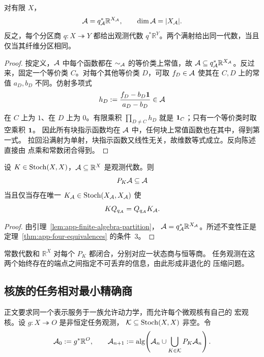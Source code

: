 \begin{lemma}
\label{lem:app-finite-algebra-partition}
对有限 $X$，
\begin{equation}
  \mathcal A=q_{\mathcal A}^*\mathbb R^{X_{\mathcal A}},
  \qquad
  \dim\mathcal A=|X_{\mathcal A}|.
  \label{eq:app-algebra-partition}
\end{equation}
反之，每个分区商 $q:X\twoheadrightarrow Y$ 都给出观测代数
$q^*\mathbb R^Y$。两个满射给出同一代数，当且仅当其纤维分区相同。
\end{lemma}

\begin{proof}
按定义，$\mathcal A$ 中每个函数都在 $\sim_{\mathcal A}$ 的等价类上常值，故
$\mathcal A\subseteq q_{\mathcal A}^*\mathbb R^{X_{\mathcal A}}$。反过来，固定一个等价类
$C$。对每个其他等价类 $D$，可取 $f_D\in\mathcal A$ 使其在 $C,D$ 上的常值
$a_D,b_D$ 不同。仿射多项式
\[
  h_D:=\frac{f_D-b_D\mathbf 1}{a_D-b_D}\in\mathcal A
\]
在 $C$ 上为 $1$、在 $D$ 上为 $0$。有限乘积
$\prod_{D\ne C}h_D$ 就是 $\mathbf 1_C$；只有一个等价类时取空乘积 $\mathbf 1$。
因此所有块指示函数均在 $\mathcal A$ 中，任何块上常值函数也在其中，得到第一式。
拉回沿满射为单射，块指示函数又线性无关，故维数等式成立。反向陈述直接由
点乘和常数闭合得到。
\end{proof}

\begin{theorem}[闭合观测代数与闭合商]
\label{thm:app-closed-algebra}
设 $K\in\operatorname{Stoch}(X,X)$，$\mathcal A\subseteq\mathbb R^X$ 是观测代数。则
\[
  P_K\mathcal A\subseteq\mathcal A
\]
当且仅当存在唯一 $K_{\mathcal A}\in\operatorname{Stoch}(X_{\mathcal A},X_{\mathcal A})$ 使
\[
  KQ_{q_{\mathcal A}}=Q_{q_{\mathcal A}}K_{\mathcal A}.
\]
\end{theorem}

\begin{proof}
由引理~\ref{lem:app-finite-algebra-partition}，
$\mathcal A=q_{\mathcal A}^*\mathbb R^{X_{\mathcal A}}$。所述不变性正是
定理~\ref{thm:app-four-equivalences} 的条件~3。
\end{proof}

常数代数和 $\mathbb R^X$ 对每个 $P_K$ 都闭合，分别对应一状态商与恒等商。
任务观测在这两个始终存在的端点之间指定不可丢弃的信息，由此形成非退化的
压缩问题。

\subsection{核族的任务相对最小精确商}

正文要求同一个表示服务于一族允许动力学，而允许每个微观核有自己的
宏观核。设 $g:X\twoheadrightarrow O$ 是非恒定任务观测，
$\mathcal K\subseteq\operatorname{Stoch}(X,X)$ 非空。令
\begin{equation}
  \mathcal A_0:=g^*\mathbb R^O,
  \qquad
  \mathcal A_{n+1}:=
  \operatorname{alg}\!\left(
    \mathcal A_n\cup\bigcup_{K\in\mathcal K}P_K\mathcal A_n
  \right).
  \label{eq:app-task-algebra-iteration}
\end{equation}

